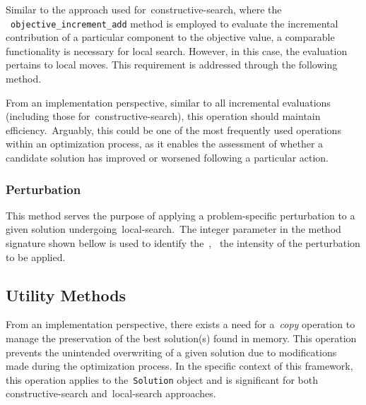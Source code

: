 Similar to the approach used for~\acrshort{constructive-search}, where the
~\texttt{objective\_increment\_add} method is employed to evaluate the
incremental contribution of a particular component to the objective value, a
comparable functionality is necessary for local search. However, in this case,
the evaluation pertains to local moves. This requirement is addressed through
the following method.

\begin{center}
\end{center}

From an implementation perspective, similar to all incremental evaluations
(including those for~\acrshort{constructive-search}), this operation should
maintain efficiency.~Arguably, this could be one of the most frequently used
operations within an optimization process, as it enables the assessment of
whether a candidate solution has improved or worsened following a particular
action.

\subsubsection*{Perturbation}

This method serves the purpose of applying a problem-specific perturbation to
a given solution undergoing~\acrshort{local-search}.~The integer parameter in the
method signature shown bellow is used to identify the~,~\ie{}
the intensity of the perturbation to be applied.

\begin{center}
\end{center}

\subsection{Utility Methods}

From an implementation perspective, there exists a need for a~\emph{copy} operation to
manage the preservation of the best solution(s) found in memory. This operation
prevents the unintended overwriting of a given solution due to modifications
made during the optimization process. In the specific context of this framework,
this operation applies to the~\texttt{Solution} object and is significant for both
\acrshort{constructive-search} and~\acrshort{local-search} approaches.

